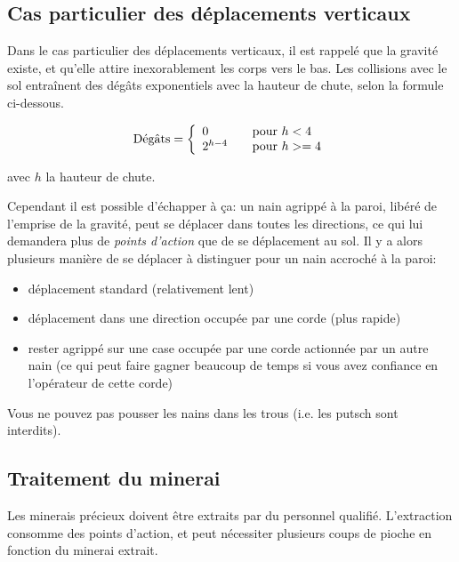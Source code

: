 \subsection{Cas particulier des déplacements verticaux}

  Dans le cas particulier des déplacements verticaux, il est rappelé que la
  gravité existe, et qu'elle attire inexorablement les corps vers le bas. Les
  collisions avec le sol entraînent des dégâts exponentiels avec la hauteur de
  chute, selon la formule ci-dessous.

  \[
    \text{Dégâts} =
    \left\{
      \begin{array}{l l}
        0         & \quad \text{pour $h < 4$}  \\
        2^{h-4} & \quad \text{pour $h >= 4$} \\
      \end{array}
    \right.
  \]

  avec $h$ la hauteur de chute.

  Cependant il est possible d'échapper à ça: un nain agrippé à la paroi, libéré
  de l'emprise de la gravité, peut se déplacer dans toutes les directions, ce
  qui lui demandera plus de \textit{points d'action} que de se déplacement au
  sol. Il y a alors plusieurs manière de se déplacer à distinguer pour un nain
  accroché à la paroi:

  \begin{itemize}
    \item déplacement standard (relativement lent)
    \item déplacement dans une direction occupée par une corde (plus rapide)
    \item rester agrippé sur une case occupée par une corde actionnée par un
      autre nain (ce qui peut faire gagner beaucoup de temps si vous avez
      confiance en l'opérateur de cette corde)
  \end{itemize}

  Vous ne pouvez pas pousser les nains dans les trous (i.e. les putsch sont
  interdits).

\subsection{Traitement du minerai}

  Les minerais précieux doivent être extraits par du personnel qualifié.
  L'extraction consomme des points d'action, et peut nécessiter plusieurs coups
  de pioche en fonction du minerai extrait.

